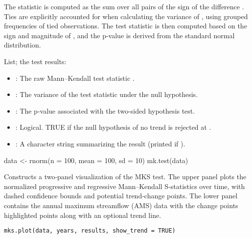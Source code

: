 \documentclass[a4paper]{book}
\begin{document}
%
\begin{Details}
The statistic  is computed as the sum over all pairs  of the sign of the
difference . Ties are explicitly accounted for when calculating the variance of
, using grouped frequencies of tied observations. The test statistic  is then
computed based on the sign and magnitude of , and the p-value is derived from the
standard normal distribution.
\end{Details}
%
\begin{Value}
List; the test results:
\begin{itemize}

\item{} : The raw Mann–Kendall test statistic .
\item{} : The variance of the test statistic under the null hypothesis.
\item{} : The p-value associated with the two-sided hypothesis test.
\item{} : Logical. TRUE if the null hypothesis of no trend is rejected at .
\item{} : A character string summarizing the result (printed if ).

\end{itemize}

\end{Value}
%
\begin{SeeAlso}
\end{SeeAlso}
%
\begin{Examples}
\begin{ExampleCode}
data <- rnorm(n = 100, mean = 100, sd = 10)
mk.test(data)

\end{ExampleCode}
\end{Examples}
%
\begin{Description}
Constructs a two‐panel visualization of the MKS test. The upper panel plots the
normalized progressive and regressive Mann–Kendall S‐statistics over time, with
dashed confidence bounds and potential trend‐change points. The lower panel
contains the annual maximum streamflow (AMS) data with the change points highlighted
points along with an optional trend line.
\end{Description}
%
\begin{Usage}
\begin{verbatim}
mks.plot(data, years, results, show_trend = TRUE)
\end{verbatim}
\end{Usage}
\end{document}
